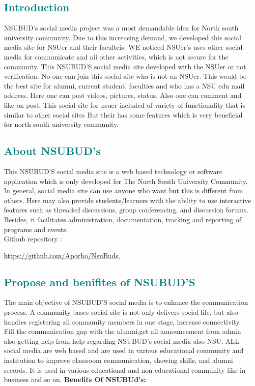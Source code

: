 \newpage


{\textcolor{teal}{\section{Introduction}}


NSUBUD's social media project was a most demandable idea for North south university community. Due to this increasing demand, we 
developed this social media site for NSUer and their faculteis. WE noticed NSUer's uses other social media for communicate and all
other activities, which is not secure for the community. This NSUBUD'S social media site developed with the NSUer or not verification.
No one can join this social site who is not an NSUer. This would be the best site for alumni, current student, faculties and who has a NSU edu mail address.
Here one can post videos, pictures, status. Also one can comment and like on post. This social site for nsuer included of variety of functionality 
that is similar to other social sites But their has some features which is very beneficial for north south university community.


{\textcolor{teal}{\section{About NSUBUD's}}

This NSUBUD'S social media site is a web based technology or software application which is only developed for The North South University Community.
In general,  social media site can use anyone who want but this is different from others. Here  may also provide students/learners
with the ability to use interactive features such as threaded discussions,
group conferencing, and discussion forums. Besides, it facilitates
administration, documentation, tracking and reporting of programs and
events.\\
 Github repository :{\textcolor{blue}{\url{https://github.com/Aporbo/NsuBuds}},
{\textcolor{teal}{\subsection{Propose and benifites of NSUBUD'S}}


The main objective of NSUBUD'S social media is to enhance the
communication process. A community bases social site is not only delivers
social life, but also handles registering all community members in one stage, increase connectivity.
 Fill the communication gap with the alumni,get all announcement from admin also
 getting help from help regarding NSUBUD's social media also NSU. ALL social media are web based and are
used in various educational community and institution to improve
classroom communication, showing skills, and alumni records. It
is used in various educational and non-educational community like in business and so on.
\newpage
\textbf {Benefits Of NSUBUd's:}

}}}}
